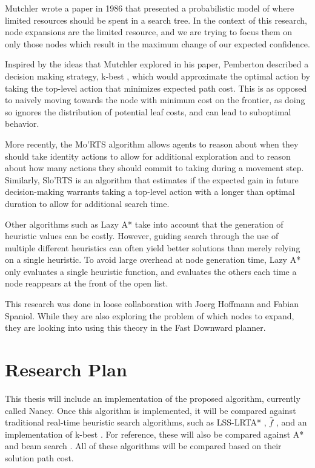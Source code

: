 \documentclass[letterpaper, 11 pt, conference]{ieeeconf}  %
\begin{document}
Mutchler wrote a paper in 1986 \cite{DBLP:conf/aaai/Mutchler86} that presented a probabilistic model of where limited resources should be spent in a search tree. In the context of this research, node expansions are the limited resource, and we are trying to focus them on only those nodes which result in the maximum change of our expected confidence.

Inspired by the ideas that Mutchler explored in his paper, Pemberton described a decision making strategy, k-best \cite{DBLP:conf/ijcai/Pemberton95}, which would approximate the optimal action by taking the top-level action that minimizes expected path cost. This is as opposed to naively moving towards the node with minimum cost on the frontier, as doing so ignores the distribution of potential leaf costs, and can lead to suboptimal behavior.

More recently, the Mo'RTS algorithm \cite{DBLP:conf/socs/OCeallaighR15} allows agents to reason about when they should take identity actions to allow for additional exploration and to reason about how many actions they should commit to taking during a movement step. Similarly, Slo'RTS \cite{DBLP:conf/aips/CsernaRF17} is an algorithm that estimates if the expected gain in future decision-making warrants taking a top-level action with a longer than optimal duration to allow for additional search time.

Other algorithms such as Lazy A* \cite{DBLP:conf/ijcai/TolpinBSFK13} take into account that the generation of heuristic values can be costly. However, guiding search through the use of multiple different heuristics can often yield better solutions than merely relying on a single heuristic. To avoid large overhead at node generation time, Lazy A* only evaluates a single heuristic function, and evaluates the others each time a node reappears at the front of the open list. 

This research was done in loose collaboration with Joerg Hoffmann and Fabian Spaniol. While they are also exploring the problem of which nodes to expand, they are looking into using this theory in the Fast Downward planner.

\section{Research Plan}

This thesis will include an implementation of the proposed algorithm, currently called Nancy. Once this algorithm is implemented, it will be compared against traditional real-time heuristic search algorithms, such as LSS-LRTA* \cite{DBLP:journals/aamas/KoenigS09}, $\hat{f}$ \cite{DBLP:journals/jair/KieselBR15}, and an implementation of k-best \cite{DBLP:conf/ijcai/Pemberton95}. For reference, these will also be compared against A* \cite{DBLP:journals/tssc/HartNR68} and beam search \cite{DBLP:conf/socs/WiltTR10}. All of these algorithms will be compared based on their solution path cost.
\end{document}
